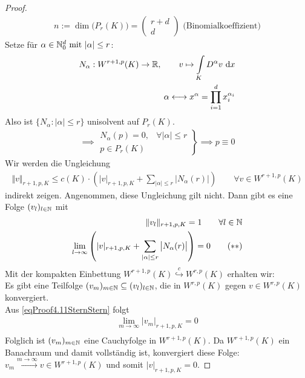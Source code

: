 \begin{proof}
	\begin{align*}
		n:=\dim \big(P_r(K)\big)=\begin{pmatrix}
			r+d\\ d
		\end{pmatrix}\text{ (Binomialkoeffizient)}
	\end{align*}
	Setze  für $\alpha\in\mathbb{N}_0^d\text{ mit }|\alpha|\leq r $:
	\begin{align*}
		N_\alpha:W^{r+1,p}(K)\to\mathbb{R},\qquad v\mapsto\int\limits_K D^\alpha v\text{ d} x\\
		\alpha\longleftrightarrow x^\alpha =\prod\limits_{i=1}^d x_i^{\alpha_i}
	\end{align*}
	Also ist $\big\lbrace N_\alpha:|\alpha|\leq r\big\rbrace$ unisolvent auf $P_r(K)$.
	\begin{align*}
		\implies\left.
		\begin{array}{cl}
			N_\alpha(p)=0, &\forall |\alpha|\leq r \\
			p\in P_r(K)&
		\end{array}
		\right\rbrace
		\implies p\equiv 0
	\end{align*}
	Wir werden die Ungleichung
	\begin{align}\label{eqProof4.11Stern}\tag{$\ast$}
		\Vert v\Vert_{r+1,p,K}\leq c(K)\cdot\left(|v|_{r+1,p,K}+\sum\limits_{|\alpha|\leq r}\big|N_\alpha (r)\big|\right)\qquad\forall v\in W^{r+1,p}(K)
	\end{align}
	indirekt zeigen. Angenommen, diese Ungleichung gilt nicht. Dann gibt es eine Folge $(v_l)_{l\in\mathbb{N}}$ mit 
	\begin{align}
		\Vert v_l\Vert_{r+1,p,K}=1\qquad\forall l\in\mathbb{N}\nonumber\\
		\lim\limits_{l\to\infty} \left(|v|_{r+1,p,K}+\sum\limits_{|\alpha|\leq r}\big|N_\alpha (r)\big|\right)=0\label{eqProof4.11SternStern}\tag{$\ast\ast$}
	\end{align}
	Mit der kompakten Einbettung $W^{r+1,p}(K)\stackrel{c}{\hookrightarrow} W^{r,p}(K)$ erhalten wir:\\
	Es gibt eine Teilfolge $(v_m)_{m\in\mathbb{N}}\subseteq(v_l)_{l\in\mathbb{N}}$, die in $W^{r,p}(K)$ gegen $v\in W^{r,p}(K)$ konvergiert.\\
	Aus \eqref{eqProof4.11SternStern} folgt
	\begin{align*}
		\lim\limits_{m\to\infty}|v_m|_{r+1,p,K}=0\\
	\end{align*}
	Folglich ist $(v_m)_{m\in\mathbb{N}}$ eine Cauchyfolge in $W^{r+1,p}(K)$.
	Da $W^{r+1,p}(K)$ ein Banachraum und damit vollständig ist, konvergiert diese Folge: $v_m\stackrel{m\to\infty}{\longrightarrow} v\in W^{r+1,p}(K)$ und somit $|v|_{r+1,p,K}=0$.

\end{proof}
